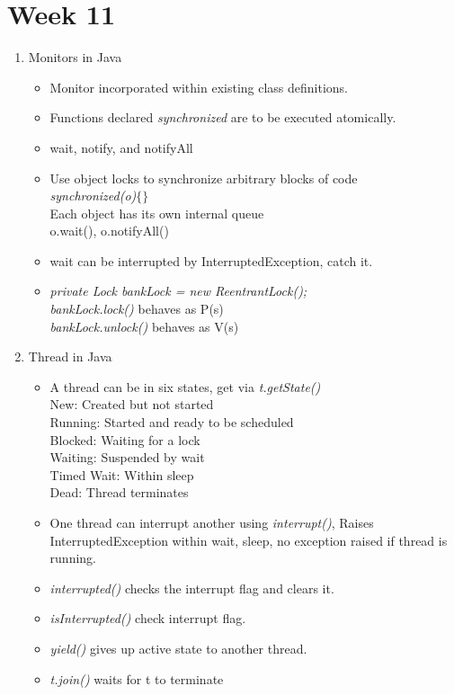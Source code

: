 \documentclass[a4paper]{article}
\begin{document}
\section{Week 11}
\begin{enumerate}
    \item Monitors in Java
    \begin{itemize}
        \item Monitor incorporated within existing class definitions.
        \item Functions declared \textit{synchronized} are to be executed atomically.
        \item wait, notify,  and notifyAll
        \item Use object locks to synchronize arbitrary blocks of code\\
        \textit{synchronized(o)$\{\}$}\\
        Each object has its own internal queue\\
        o.wait(), o.notifyAll()
        \item wait can be interrupted by InterruptedException, catch it.
        \item \textit{private Lock bankLock = new ReentrantLock();}\\
        \textit{bankLock.lock()} behaves as P(s)\\
        \textit{bankLock.unlock()} behaves as V(s)
    \end{itemize}
    \item Thread in Java
    \begin{itemize}
        \item A thread can be in six states, get via \textit{t.getState()}\\
        New: Created but not started\\
        Running: Started and ready to be scheduled\\
        Blocked: Waiting for a lock\\
        Waiting: Suspended by wait\\
        Timed Wait: Within sleep\\
        Dead: Thread terminates
        \item One thread can interrupt another using \textit{interrupt()}, Raises InterruptedException within wait, sleep, no exception raised if thread is running.
        \item \textit{interrupted()} checks the interrupt flag and clears it.
        \item \textit{isInterrupted()} check interrupt flag.
        \item \textit{yield()} gives up active state to another thread.
        \item \textit{t.join()} waits for t to terminate
    \end{itemize}
\end{enumerate}
\end{document}
